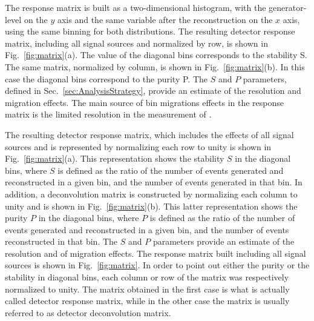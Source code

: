 The response matrix is built as a two-dimensional histogram, with the
generator-level \pth{} on the $y$ axis and the same variable after the reconstruction on the $x$ axis, using the same binning for both
distributions.
The resulting detector response matrix, including all signal sources and normalized by row, is shown in Fig.~\ref{fig:matrix}(a).
The value of the diagonal bins corresponds to the stability S. The same matrix, normalized by column, is shown in Fig.~\ref{fig:matrix}(b). In this case the diagonal bins correspond to the purity P. The $S$ and $P$ parameters, defined in Sec.~\ref{sec:AnalysisStrategy}, provide an estimate of the \pth resolution and migration effects.
The main source of bin migrations effects in the response matrix is the limited resolution in the measurement of \MET.

The resulting detector response matrix, which includes the effects of all signal sources and is represented by normalizing each row to unity is shown in Fig.~\ref{fig:matrix}(a). This representation shows the stability $S$ in the diagonal bins, where $S$ is defined as the ratio of the number of events generated and reconstructed in a given bin, and the number of events generated in that bin. In addition, a deconvolution matrix is constructed by normalizing each column to unity and is shown in Fig.~\ref{fig:matrix}(b). This latter representation shows the purity $P$ in the diagonal bins, where $P$ is defined as the ratio of the number of events generated and reconstructed in a given bin, and the number of events reconstructed in that bin. The $S$ and $P$ parameters provide an estimate of the \pth{} resolution and of migration effects.
The response matrix built including all signal sources is shown in Fig.~\ref{fig:matrix}. In order to point out either the purity or the stability in diagonal bins, each column or row of the matrix was respectively normalized to unity. The matrix obtained in the first case is what is actually called detector response matrix, while in the other case the matrix is usually referred to as detector deconvolution matrix.

